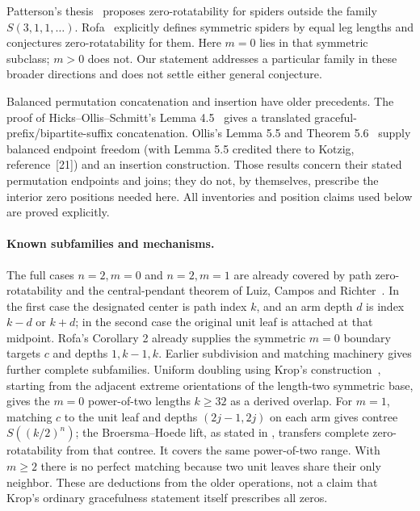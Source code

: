 \documentclass[11pt,a4paper]{article}
\theoremstyle{definition}\newtheorem{definition}[theorem]{Definition}
\theoremstyle{remark}\newtheorem{remark}[theorem]{Remark}
\begin{document}
Patterson's thesis~\cite[Section 5.4, Conjecture 5.4.4]{patterson}
proposes zero-rotatability for spiders outside the family $S(3,1,1,\ldots)$.
Rofa~\cite[Introduction, pp.~3--4, and Summary]{rofa} explicitly defines
symmetric spiders by equal leg lengths and conjectures zero-rotatability
for them. Here $m=0$ lies in that symmetric subclass; $m>0$
does not. Our statement addresses a particular family in these broader
directions and does not settle either general conjecture.

Balanced permutation concatenation and insertion have older precedents.
The proof of Hicks--Ollis--Schmitt's Lemma 4.5~\cite{hos} gives a
translated graceful-prefix/bipartite-suffix concatenation. Ollis's
Lemma 5.5 and Theorem 5.6~\cite{ollis} supply balanced endpoint freedom
(with Lemma 5.5 credited there to Kotzig, reference~[21]) and an insertion construction.
Those results concern their stated permutation endpoints and joins;
they do not, by themselves, prescribe the interior zero positions needed
here. All inventories and position claims used below are proved explicitly.


\paragraph{Known subfamilies and mechanisms.}
The full cases $n=2,m=0$ and $n=2,m=1$ are already covered by path
zero-rotatability and the central-pendant theorem of Luiz, Campos and
Richter~\cite[Lemma 4 and Theorem 14]{lcr}. In the first case the
designated center is path index $k$, and an arm depth $d$ is index
$k-d$ or $k+d$; in the second case the original unit leaf is attached
at that midpoint. Rofa's Corollary 2 already supplies the symmetric
$m=0$ boundary targets $c$ and depths $1,k-1,k$.
Earlier subdivision and matching machinery gives further complete
subfamilies. Uniform doubling using Krop's construction~\cite[Theorem
2.4 and generalized $\Delta_{+1}$ construction]{krop}, starting from
the adjacent extreme orientations of the length-two symmetric base,
gives the $m=0$ power-of-two lengths $k\ge32$ as a derived overlap.
For $m=1$, matching $c$ to the unit leaf and depths $(2j-1,2j)$ on each
arm gives contree $S((k/2)^n)$; the Broersma--Hoede lift, as stated in
\cite[Lemma 3 and Theorem 9]{lcr}, transfers complete zero-rotatability
from that contree. It covers the same power-of-two range. With $m\ge2$
there is no perfect matching because two unit leaves share their only
neighbor. These are deductions from the older operations, not a claim
that Krop's ordinary gracefulness statement itself prescribes all zeros.
\end{document}
